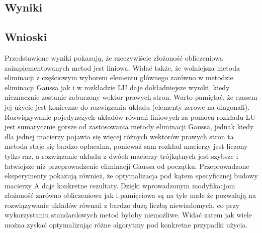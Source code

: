 \documentclass{mk-polish-lab-report}
\begin{document}
\subsection{Wyniki}

\subsection{Wnioski}

Przedstawione wyniki pokazują, że rzeczywiście złożoność obliczeniowa zaimplementowanych metod jest liniowa. Widać także, że wolniejsza metoda eliminacji z częściowym wyborem elementu głównego zarówno w metodzie eliminacji Gaussa jak i w rozkładzie LU daje dokładniejsze wyniki, kiedy nieznacznie zostanie zaburzony wektor prawych stron. Warto pamiętać, że czasem jej użycie jest konieczne do rozwiązania układu (elementy zerowe na diagonali). Rozwiązywanie pojedynczych układów równań liniowych za pomocą rozkładu LU jest sumarycznie gorsze od zastosowania metody eliminacji Gaussa, jednak kiedy dla jednej macierzy pojawia się więcej różnych wektorów prawych stron ta metoda staje się bardzo opłacalna, ponieważ sam rozkład macierzy jest liczony tylko raz, a rozwiązanie układu z dwóch macierzy trójkątnych jest szybsze i łatwiejsze niż przeprowadzenie eliminacji Gaussa od początku. Przeprowadzone eksperymenty pokazują również, że optymalizacja pod kątem specyficznej budowy macierzy A daje konkretne rezultaty. Dzięki wprowadzonym modyfikacjom złożoność zarówno obliczeniowa jak i pamięciowa są na tyle małe że pozwalają na rozwiązywanie układów równań z bardzo dużą liczbą niewiadomych, co przy wykorzystaniu standardowych metod byłoby niemożliwe. Widać zatem jak wiele można zyskać optymalizując różne algorytmy pod konkretne przypadki użycia.
\end{document}
